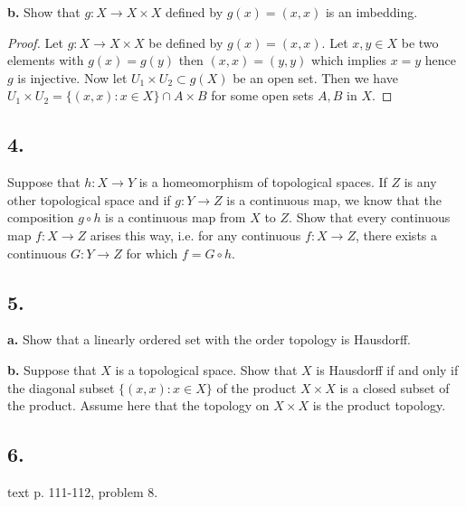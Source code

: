 \documentclass{amsart}
\theoremstyle{plain}
\theoremstyle{definition}
\theoremstyle{remark}
\begin{document}
\vspace{.1in}
{\bfseries b.} Show that $g : X \rightarrow X \times X$ defined by $g(x) = (x, x )$ is an imbedding. 

\begin{proof}
    Let $g:X \to X\times X$ be defined by $g(x)=(x,x)$. Let $x,y\in X$ be two elements with $g(x)=g(y)$ then $(x,x)=(y,y)$ which implies $x=y$ hence $g$ is injective. Now let $U_1 \times U_2 \subset g(X)$ be an open set. Then we have $U_1\times U_2=\{(x,x):x\in X\}\cap A\times B$ for some open sets $A,B$ in $X$.
\end{proof}


\vspace{.15in}

\noindent
\subsection*{4.} Suppose that $h : X \rightarrow Y$ is a homeomorphism of topological spaces. If $Z$ is any other topological space and if $g : Y \rightarrow Z$ is a continuous map, we know that the composition $g\circ h$ is a continuous map from $X$ to $Z$. Show that every continuous map $f : X \rightarrow Z$ arises this way, i.e. for any continuous $f : X \rightarrow Z$, there exists a continuous $G : Y \rightarrow Z$ for which $f = G \circ h$. 
\vspace{.15in}

\noindent
\subsection*{5.}

{\bf a.} Show that a linearly ordered set with the order topology is Hausdorff. 

{\bf b.} Suppose that $X$ is a topological space. Show that $X$ is Hausdorff if and only if the diagonal subset $\{ (x , x ) : x\in X\}$ of the product $X\times X$ is a closed subset of the product. Assume here that the topology on $X\times X$ is the product topology.



\vspace{.15in}

\noindent
\subsection*{6.} text p. 111-112, problem 8. 



 
\end{document}
